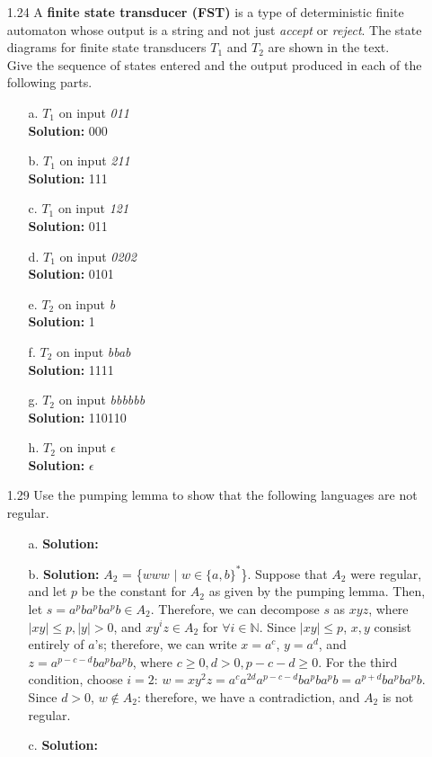 \begin{enumerate}
\item[1.24]A \textbf{finite state transducer (FST)} is a type of deterministic finite automaton whose output is a string and not just \textit{accept} or \textit{reject}. The state diagrams for finite state transducers $T_{1}$ and $T_{2}$ are shown in the text.
\\
Give the sequence of states entered and the output produced in each of the following parts.
\begin{enumerate}
\item[a.]$T_{1}$ on input \textit{011}
\\
\textbf{Solution:} 000
\item[b.]$T_{1}$ on input \textit{211}
\\
\textbf{Solution:} 111
\item[c.]$T_{1}$ on input \textit{121}
\\
\textbf{Solution:} 011
\item[d.]$T_{1}$ on input \textit{0202}
\\
\textbf{Solution:} 0101
\item[e.]$T_{2}$ on input \textit{b}
\\
\textbf{Solution:} 1
\item[f.]$T_{2}$ on input \textit{bbab}
\\
\textbf{Solution:} 1111
\item[g.]$T_{2}$ on input \textit{bbbbbb}
\\
\textbf{Solution:} 110110
\item[h.]$T_{2}$ on input $\epsilon$
\\
\textbf{Solution:} $\epsilon$
\end{enumerate}

\item[1.29]Use the pumping lemma to show that the following languages are not regular.
\begin{enumerate}
\item[a.]\textbf{Solution:} \alreadyanswered
\item[b.]\textbf{Solution:} $A_2$ = \{$www$ $|$ $w \in \{a, b\}^*$\}. Suppose that $A_2$ were regular, and let $p$ be the constant for $A_2$ as given by the pumping lemma. Then, let $s = a^{p}ba^{p}ba^{p}b \in A_2$. Therefore, we can decompose $s$ as $xyz$, where $|xy| \le p, |y| > 0$, and $xy^iz \in A_2$ for $\forall i \in \mathbb{N}$. Since $|xy| \le p$, $x, y$ consist entirely of $a$'s; therefore, we can write $x = a^c$, $y = a^d$, and $z = a^{p-c-d}ba^{p}ba^{p}b$, where $c \ge 0, d > 0, p-c-d \ge 0$. For the third condition, choose $i = 2$: $w = xy^{2}z = a^{c}a^{2d}a^{p-c-d}ba^{p}ba^{p}b = a^{p+d}ba^{p}ba^{p}b$. Since $d > 0$, $w \notin A_2$: therefore, we have a contradiction, and $A_2$ is not regular.
\item[c.]\textbf{Solution:} \alreadyanswered
\end{enumerate}


\end{enumerate}
